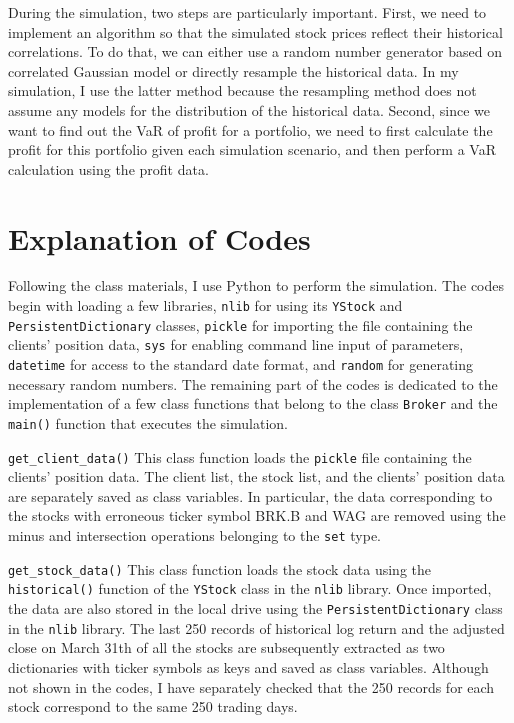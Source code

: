 \documentclass[letterpaper,11pt]{article}
\begin{document}
During the simulation, two steps are particularly important.
First, we need to implement an algorithm so that the simulated stock prices reflect their historical correlations.
To do that, we can either use a random number generator based on correlated Gaussian model or directly resample the historical data.
In my simulation, I use the latter method because the resampling method does not assume any models for the distribution of the historical data.
Second, since we want to find out the VaR of profit for a portfolio, we need to first calculate the profit for this portfolio given each simulation scenario, and then perform a VaR calculation using the profit data.

\section{Explanation of Codes}

Following the class materials, I use Python to perform the simulation. 
The codes begin with loading a few libraries, \texttt{nlib} for using its \texttt{YStock} and \texttt{PersistentDictionary} classes, \texttt{pickle} for importing the file containing the clients' position data, \texttt{sys} for enabling command line input of parameters, \texttt{datetime} for access to the standard date format, and \texttt{random} for generating necessary random numbers.
The remaining part of the codes is dedicated to the implementation of a few class functions that belong to the class \texttt{Broker} and the \texttt{main()} function that executes the simulation.

\texttt{get\_client\_data()} This class function loads the \texttt{pickle} file containing the clients' position data.
The client list, the stock list, and the clients' position data are separately saved as class variables.
In particular, the data corresponding to the stocks with erroneous ticker symbol BRK.B and WAG are removed using the minus and intersection operations belonging to the \texttt{set} type.

\texttt{get\_stock\_data()} This class function loads the stock data using the \texttt{historical()} function of the \texttt{YStock} class in the \texttt{nlib} library. 
Once imported, the data are also stored in the local drive using the \texttt{PersistentDictionary} class in the \texttt{nlib} library.
The last 250 records of historical log return and the adjusted close on March 31th of all the stocks are subsequently extracted as two dictionaries with ticker symbols as keys and saved as class variables.
Although not shown in the codes, I have separately checked that the 250 records for each stock correspond to the same 250 trading days.
\end{document}
